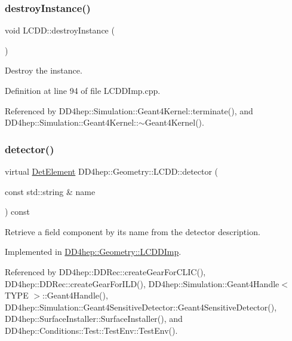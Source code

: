 \subsubsection{\texorpdfstring{destroy\+Instance()}{destroyInstance()}}
{\footnotesize\ttfamily void L\+C\+D\+D\+::destroy\+Instance (\begin{DoxyParamCaption}{ }\end{DoxyParamCaption})\hspace{0.3cm}{\ttfamily [static]}}



Destroy the instance. 



Definition at line 94 of file L\+C\+D\+D\+Imp.\+cpp.



Referenced by D\+D4hep\+::\+Simulation\+::\+Geant4\+Kernel\+::terminate(), and D\+D4hep\+::\+Simulation\+::\+Geant4\+Kernel\+::$\sim$\+Geant4\+Kernel().

\hypertarget{class_d_d4hep_1_1_geometry_1_1_l_c_d_d_a0ed0c4e5d72a1e07ce11cf2592d6de3e}{}\label{class_d_d4hep_1_1_geometry_1_1_l_c_d_d_a0ed0c4e5d72a1e07ce11cf2592d6de3e} 
\subsubsection{\texorpdfstring{detector()}{detector()}}
{\footnotesize\ttfamily virtual \hyperlink{class_d_d4hep_1_1_geometry_1_1_det_element}{Det\+Element} D\+D4hep\+::\+Geometry\+::\+L\+C\+D\+D\+::detector (\begin{DoxyParamCaption}\item[{const std\+::string \&}]{name }\end{DoxyParamCaption}) const\hspace{0.3cm}{\ttfamily [pure virtual]}}



Retrieve a field component by it\textquotesingle{}s name from the detector description. 



Implemented in \hyperlink{class_d_d4hep_1_1_geometry_1_1_l_c_d_d_imp_af8a5b886ba20e4daa92945f562b0b3dc}{D\+D4hep\+::\+Geometry\+::\+L\+C\+D\+D\+Imp}.



Referenced by D\+D4hep\+::\+D\+D\+Rec\+::create\+Gear\+For\+C\+L\+I\+C(), D\+D4hep\+::\+D\+D\+Rec\+::create\+Gear\+For\+I\+L\+D(), D\+D4hep\+::\+Simulation\+::\+Geant4\+Handle$<$ T\+Y\+P\+E $>$\+::\+Geant4\+Handle(), D\+D4hep\+::\+Simulation\+::\+Geant4\+Sensitive\+Detector\+::\+Geant4\+Sensitive\+Detector(), D\+D4hep\+::\+Surface\+Installer\+::\+Surface\+Installer(), and D\+D4hep\+::\+Conditions\+::\+Test\+::\+Test\+Env\+::\+Test\+Env().


